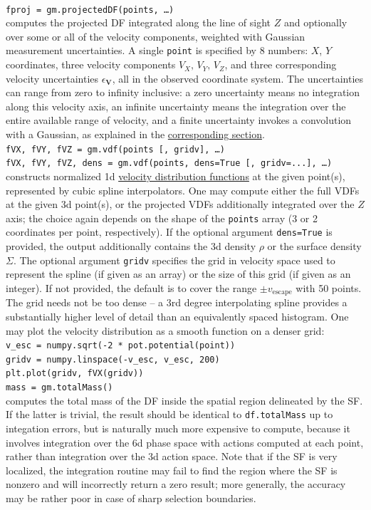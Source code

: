 \documentclass[12pt]{article}
\newcommand{\bV}{\boldsymbol{V}}
\begin{document}
\\[2mm]
\texttt{fproj = gm.projectedDF(points, \dots)}\\
computes the projected DF integrated along the line of sight $Z$ and optionally over some or all of the velocity components, weighted with Gaussian measurement uncertainties. A single \texttt{point} is specified by 8 numbers: $X$, $Y$ coordinates, three velocity components $V_X,\,V_Y,\,V_Z$, and three corresponding velocity uncertainties $\epsilon_{\bV}$, all in the observed coordinate system. The uncertainties can range from zero to infinity inclusive: a zero uncertainty means no integration along this velocity axis, an infinite uncertainty means the integration over the entire available range of velocity, and a finite uncertainty invokes a convolution with a Gaussian, as explained in the \hyperref[sec:ProjectedDF]{corresponding section}.\\[2mm]
\texttt{fVX, fVY, fVZ = gm.vdf(points [, gridv], \dots)}\\
\texttt{fVX, fVY, fVZ, dens = gm.vdf(points, dens=True [, gridv=...], \dots)}\\
constructs normalized 1d \hyperref[sec:VDF]{velocity distribution functions} at the given point(s), represented by cubic spline interpolators. One may compute either the full VDFs at the given 3d point(s), or the projected VDFs additionally integrated over the $Z$ axis; the choice again depends on the shape of the \texttt{points} array (3 or 2 coordinates per point, respectively). If the optional argument \texttt{dens=True} is provided, the output additionally contains the 3d density $\rho$ or the surface density $\Sigma$.
The optional argument \texttt{gridv} specifies the grid in velocity space used to represent the spline (if given as an array) or the size of this grid (if given as an integer). If not provided, the default is to cover the range $\pm v_\mathrm{escape}$ with 50 points. The grid needs not be too dense -- a 3rd degree interpolating spline provides a substantially higher level of detail than an equivalently spaced histogram.
One may plot the velocity distribution as a smooth function on a denser grid:\\[1mm]
\texttt{v_esc = numpy.sqrt(-2 * pot.potential(point))\\
gridv = numpy.linspace(-v_esc, v_esc, 200)\\
plt.plot(gridv, fVX(gridv))} \\[2mm]
\texttt{mass = gm.totalMass()}\\
computes the total mass of the DF inside the spatial region delineated by the SF. If the latter is trivial, the result should be identical to \texttt{df.totalMass} up to integation errors, but is naturally much more expensive to compute, because it involves integration over the 6d phase space with actions computed at each point, rather than integration over the 3d action space. Note that if the SF is very localized, the integration routine may fail to find the region where the SF is nonzero and will incorrectly return a zero result; more generally, the accuracy may be rather poor in case of sharp selection boundaries.\\[2mm]
\end{document}
